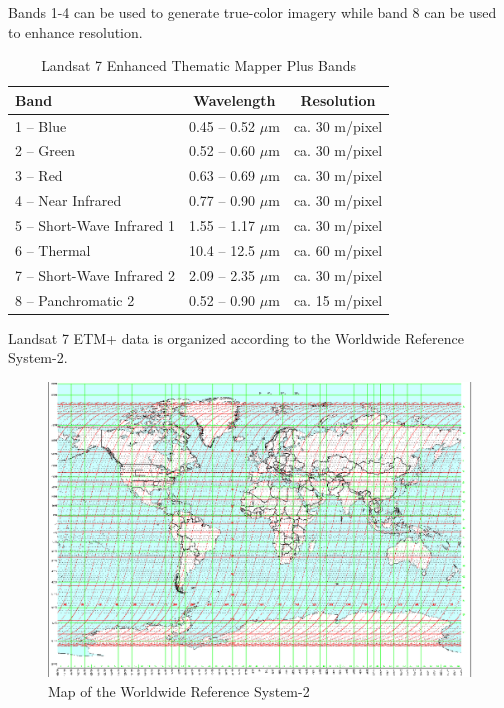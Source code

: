 Bands 1-4 can be used to generate true-color imagery while band 8 can be used to enhance resolution.

\begin{table}[h!]
  \begin{center}
    \begin{tabular}{ l | c | c }
      \toprule
      \textbf{Band} & \textbf{Wavelength} & \textbf{Resolution} \\ \midrule
      1 -- Blue                  & 0.45 -- 0.52 $\mu$m & ca. 30 m/pixel \\
      2 -- Green                 & 0.52 -- 0.60 $\mu$m & ca. 30 m/pixel \\
      3 -- Red                   & 0.63 -- 0.69 $\mu$m & ca. 30 m/pixel \\
      4 -- Near Infrared         & 0.77 -- 0.90 $\mu$m & ca. 30 m/pixel \\
      5 -- Short-Wave Infrared 1 & 1.55 -- 1.17 $\mu$m & ca. 30 m/pixel \\
      6 -- Thermal               & 10.4 -- 12.5 $\mu$m & ca. 60 m/pixel \\
      7 -- Short-Wave Infrared 2 & 2.09 -- 2.35 $\mu$m & ca. 30 m/pixel \\
      8 -- Panchromatic 2        & 0.52 -- 0.90 $\mu$m & ca. 15 m/pixel \\
      \bottomrule
    \end{tabular}
    \caption{Landsat 7 Enhanced Thematic Mapper Plus Bands}
  \end{center}
\end{table}

Landsat 7 ETM+ data is organized according to the Worldwide Reference System-2.

\begin{figure}[h!]
  \centering
  \includegraphics[width=140mm]{images/landsat_7_wrs2.eps}
  \caption{Map of the Worldwide Reference System-2}
\end{figure}

